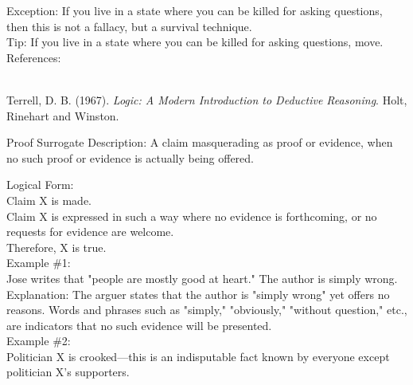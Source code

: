 \documentclass[a4paper,12pt,single,pdftex]{scrartcl}
\begin{document}
    
      Exception: If you live in a state where you can be killed for asking questions, then this is not a fallacy, but a survival technique.
    \\

    
      Tip: If you live in a state where you can be killed for asking questions, move.
    \\

    References:

    
      
        
      \\

      
        
          Terrell, D. B. (1967). {\it Logic: A Modern Introduction to Deductive Reasoning}. Holt, Rinehart and Winston.
        
      
    
  

Proof Surrogate
    Description: A claim masquerading as proof or evidence, when no such proof or evidence is actually being offered.

    
      Logical Form:
    \\

    
      Claim X is made.
    \\

    
      Claim X is expressed in such a way where no evidence is forthcoming, or no requests for evidence are welcome.
    \\

    
      Therefore, X is true.
    \\

    
      Example \#1:
    \\

    
      Jose writes that "people are mostly good at heart." The author is simply wrong.
    \\

    
      Explanation: The arguer states that the author is "simply wrong" yet offers no reasons. Words and phrases such as "simply," "obviously," "without question," etc., are indicators that no such evidence will be presented.
    \\

    
      Example \#2:
    \\

    
      Politician X is crooked—this is an indisputable fact known by everyone except politician X's supporters.
    \\
\end{document}
